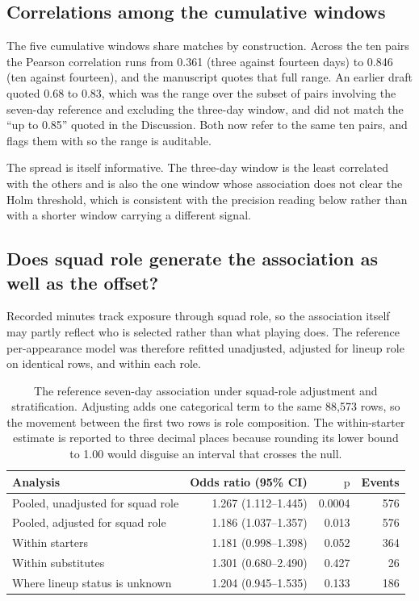 \documentclass[11pt]{article}
\newcommand{\pval}{\mathrm{p}}
\begin{document}
\subsection*{Correlations among the cumulative windows}

The five cumulative windows share matches by construction. Across the ten pairs the Pearson correlation runs from 0.361 (three against fourteen days) to 0.846 (ten against fourteen), and the manuscript quotes that full range. An earlier draft quoted 0.68 to 0.83, which was the range over the subset of pairs involving the seven-day reference and excluding the three-day window, and did not match the ``up to 0.85'' quoted in the Discussion. Both now refer to the same ten pairs, and  flags them with  so the range is auditable.

The spread is itself informative. The three-day window is the least correlated with the others and is also the one window whose association does not clear the Holm threshold, which is consistent with the precision reading below rather than with a shorter window carrying a different signal.

\subsection*{Does squad role generate the association as well as the offset?}

Recorded minutes track exposure through squad role, so the association itself may partly reflect who is selected rather than what playing does. The reference per-appearance model was therefore refitted unadjusted, adjusted for lineup role on identical rows, and within each role.

\begin{table}[h]
\centering
\caption{The reference seven-day association under squad-role adjustment and stratification. Adjusting adds one categorical term to the same 88,573 rows, so the movement between the first two rows is role composition. The within-starter estimate is reported to three decimal places because rounding its lower bound to 1.00 would disguise an interval that crosses the null.}
\label{tab:supp_role_association}
\small
\begin{tabular}{lrrr}
\toprule
Analysis & Odds ratio (95\% CI) & $\pval$ & Events\\
\midrule
Pooled, unadjusted for squad role & 1.267 (1.112--1.445) & 0.0004 & 576\\
Pooled, adjusted for squad role & 1.186 (1.037--1.357) & 0.013 & 576\\
Within starters & 1.181 (0.998--1.398) & 0.052 & 364\\
Within substitutes & 1.301 (0.680--2.490) & 0.427 & 26\\
Where lineup status is unknown & 1.204 (0.945--1.535) & 0.133 & 186\\
\bottomrule
\end{tabular}
\end{table}
\end{document}
